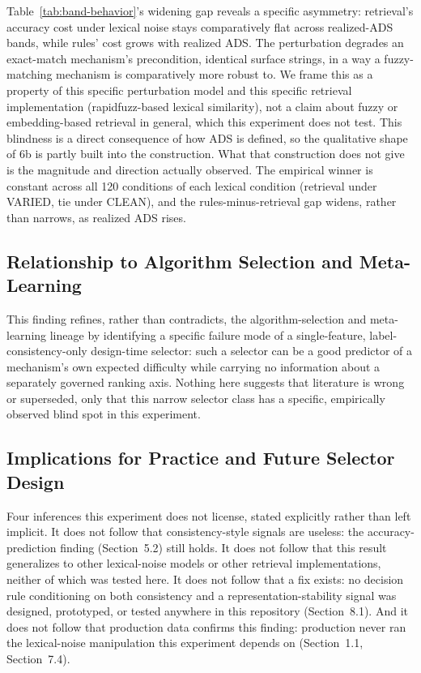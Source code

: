\documentclass[11pt]{article}
\begin{document}
Table~\ref{tab:band-behavior}'s widening gap reveals a specific asymmetry: retrieval's
accuracy cost under lexical noise stays comparatively flat across realized-ADS
bands, while rules' cost grows with realized ADS. The perturbation degrades
an exact-match mechanism's precondition, identical surface strings, in a
way a fuzzy-matching mechanism is comparatively more robust to. We frame this
as a property of this specific perturbation model and this specific
retrieval implementation (rapidfuzz-based lexical similarity), not a claim
about fuzzy or embedding-based retrieval in general, which this experiment
does not test. This blindness is a direct consequence of how ADS is defined,
so the qualitative shape of 6b is partly built into the construction. What
that construction does not give is the magnitude and direction actually
observed. The empirical winner is constant across all 120 conditions of
each lexical condition (retrieval under VARIED, tie under CLEAN), and the
rules-minus-retrieval gap widens, rather than narrows, as realized ADS rises.

\subsection{Relationship to Algorithm Selection and Meta-Learning}
\label{sec:relation-algorithm-selection}

This finding refines, rather than contradicts, the algorithm-selection and
meta-learning lineage \citep{rice1976,smithmiles2009,barbudo2023} by
identifying a specific failure mode of a single-feature, label-consistency-only
design-time selector: such a selector can be a good predictor of a
mechanism's own expected difficulty while carrying no information about a
separately governed ranking axis. Nothing here suggests that literature is
wrong or superseded, only that this narrow selector class has a specific,
empirically observed blind spot in this experiment.

\subsection{Implications for Practice and Future Selector Design}
\label{sec:implications-practice}

Four inferences this experiment does not license, stated explicitly rather
than left implicit. It does not follow that consistency-style signals are
useless: the accuracy-prediction finding (Section~5.2) still holds. It
does not follow that this result generalizes to other lexical-noise models or
other retrieval implementations, neither of which was tested here. It does
not follow that a fix exists: no decision rule conditioning on both
consistency and a representation-stability signal was designed, prototyped,
or tested anywhere in this repository (Section~8.1). And it does not follow
that production data confirms this finding: production never ran the
lexical-noise manipulation this experiment depends on (Section~1.1,
Section~7.4).
\end{document}
